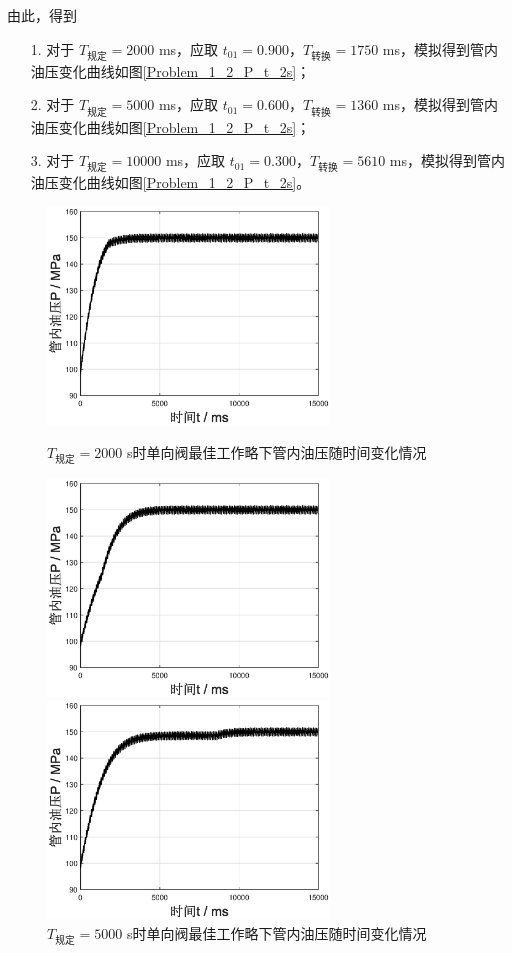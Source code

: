 \documentclass[12pt,a4paper]{article}
\begin{document}
由此，得到
\begin{itemize}
\item[1.] 对于 $T_{\text{规定}}=2000$ ms，应取 $t_{01}=0.900$，$T_{\text{转换}}=1750$ ms，模拟得到管内油压变化曲线如图\ref{Problem_1_2_P_t_2s}；
\item[2.] 对于 $T_{\text{规定}}=5000$ ms，应取 $t_{01}=0.600$，$T_{\text{转换}}=1360$ ms，模拟得到管内油压变化曲线如图\ref{Problem_1_2_P_t_2s}；
\item[3.] 对于 $T_{\text{规定}}=10000$ ms，应取 $t_{01}=0.300$，$T_{\text{转换}}=5610$ ms，模拟得到管内油压变化曲线如图\ref{Problem_1_2_P_t_2s}。
\end{itemize}
\begin{figure}[htbp]
\centering
\begin{minipage}[t]{0.48\textwidth}
\centering
\includegraphics[width=7.5cm]{Problem_1_2_P_t_2s.eps}
\caption{$T_{\text{规定}}=2000$ s时单向阀最佳工作略下管内油压随时间变化情况}\label{Problem_1_2_P_t_2s}
\end{minipage}
\begin{minipage}[t]{0.48\textwidth}
\centering
\includegraphics[width=7.5cm]{Problem_1_2_P_t_5s.eps}
\caption{$T_{\text{规定}}=5000$ s时单向阀最佳工作略下管内油压随时间变化情况}\label{Problem_1_2_P_t_5s}
\end{minipage}
\begin{minipage}[t]{0.48\textwidth}
\centering
\includegraphics[width=7.5cm]{Problem_1_2_P_t_10s.eps}

\end{minipage}
\end{figure}
\end{document}
